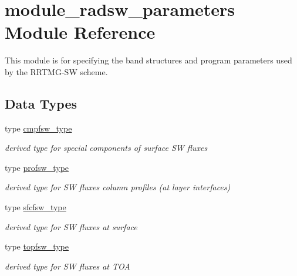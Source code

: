 \hypertarget{namespacemodule__radsw__parameters}{}\section{module\+\_\+radsw\+\_\+parameters Module Reference}
\label{namespacemodule__radsw__parameters}


This module is for specifying the band structures and program parameters used by the R\+R\+T\+M\+G-\/\+SW scheme.  


\subsection*{Data Types}
\begin{DoxyCompactItemize}
\item 
type \hyperlink{structmodule__radsw__parameters_1_1cmpfsw__type}{cmpfsw\+\_\+type}
\begin{DoxyCompactList}\small\item\em derived type for special components of surface SW fluxes \end{DoxyCompactList}\item 
type \hyperlink{structmodule__radsw__parameters_1_1profsw__type}{profsw\+\_\+type}
\begin{DoxyCompactList}\small\item\em derived type for SW fluxes\textquotesingle{} column profiles (at layer interfaces) \end{DoxyCompactList}\item 
type \hyperlink{structmodule__radsw__parameters_1_1sfcfsw__type}{sfcfsw\+\_\+type}
\begin{DoxyCompactList}\small\item\em derived type for SW fluxes at surface \end{DoxyCompactList}\item 
type \hyperlink{structmodule__radsw__parameters_1_1topfsw__type}{topfsw\+\_\+type}
\begin{DoxyCompactList}\small\item\em derived type for SW fluxes at T\+OA \end{DoxyCompactList}\end{DoxyCompactItemize}
